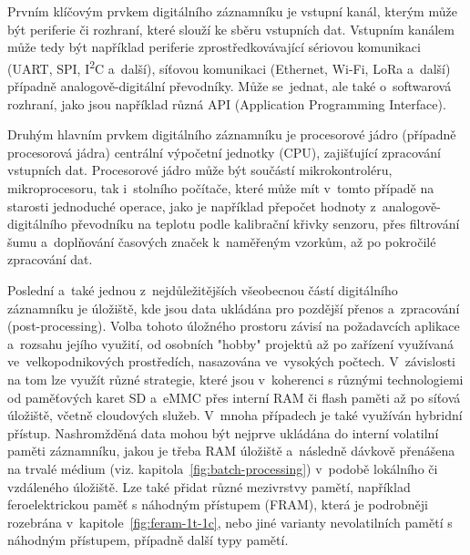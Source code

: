 Prvním klíčovým prvkem digitálního záznamníku je vstupní kanál, kterým může být periferie či rozhraní, které slouží ke sběru vstupních dat. Vstupním kanálem může tedy být například periferie zprostředkovávající sériovou komunikaci (UART, SPI, I\textsuperscript{2}C a~další), síťovou komunikaci (Ethernet, Wi-Fi, LoRa a~další) případně analogově-digitální převodníky. Může se~jednat, ale také o~softwarová rozhraní, jako jsou například různá API (Application Programming Interface).~\cite{microsoft_wmi_win32, researchgate_general_dataloggger_multiple_sdcards, ieee_digital_sound_recorder_arm_sd_card}

Druhým hlavním prvkem digitálního záznamníku je procesorové jádro (případně procesorová jádra) centrální výpočetní jednotky (CPU), zajišťující zpracování vstupních dat. Procesorové jádro může být součástí mikrokontroléru, mikroprocesoru, tak i~stolního počítače, které může mít v~tomto případě na starosti jednoduché operace, jako je například přepočet hodnoty z~analogově-digitálního převodníku na teplotu podle kalibrační křivky senzoru, přes filtrování šumu a~doplňování časových značek k~naměřeným vzorkům, až po pokročilé zpracování dat.~\cite{smart_datalogger_data_acquisition_cpu, researchgate_general_dataloggger_multiple_sdcards, springer_development_ECG_recorder}

\newpage

Poslední a~také jednou z~nejdůležitějších všeobecnou částí digitálního záznamníku je úložiště, kde jsou data ukládána pro pozdější přenos a~zpracování (post-processing). Volba tohoto úložného prostoru závisí na požadavcích aplikace a~rozsahu jejího využití, od osobních "hobby" projektů až po zařízení využívaná ve~velkopodnikových prostředích, nasazována ve~vysokých počtech. V~závislosti na tom lze využít různé strategie, které jsou v~koherenci s různými technologiemi od paměťových karet SD a~eMMC přes interní RAM či flash paměti až po síťová úložiště, včetně cloudových služeb. V~mnoha případech je také využíván hybridní přístup. Nashromžděná data mohou být nejprve ukládána do interní volatilní paměti záznamníku, jakou je třeba RAM úložiště a~následně dávkově přenášena na trvalé médium (viz. kapitola~\ref{fig:batch-processing}) v~podobě lokálního či vzdáleného úložiště. Lze také přidat různé mezivrstvy pamětí, například feroelektrickou paměť s náhodným přístupem (FRAM), která je podrobněji rozebrána v~kapitole~\ref{fig:feram-1t-1c}, nebo jiné varianty nevolatilních pamětí s náhodným přístupem, případně další typy pamětí.~\cite{datalogger_sd_mmc_usb_flash_disk, researchgate_general_dataloggger_multiple_sdcards, rta_local_vs_cloud}

